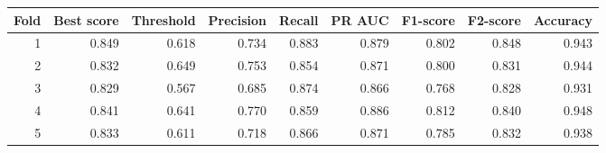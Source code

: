 \begin{tabular}{rrrrrrrrr}
\toprule
Fold & Best score & Threshold & Precision & Recall & PR AUC & F1-score & F2-score & Accuracy \\
\midrule
1 & 0.849 & 0.618 & 0.734 & 0.883 & 0.879 & 0.802 & 0.848 & 0.943 \\
2 & 0.832 & 0.649 & 0.753 & 0.854 & 0.871 & 0.800 & 0.831 & 0.944 \\
3 & 0.829 & 0.567 & 0.685 & 0.874 & 0.866 & 0.768 & 0.828 & 0.931 \\
4 & 0.841 & 0.641 & 0.770 & 0.859 & 0.886 & 0.812 & 0.840 & 0.948 \\
5 & 0.833 & 0.611 & 0.718 & 0.866 & 0.871 & 0.785 & 0.832 & 0.938 \\
\bottomrule
\end{tabular}
